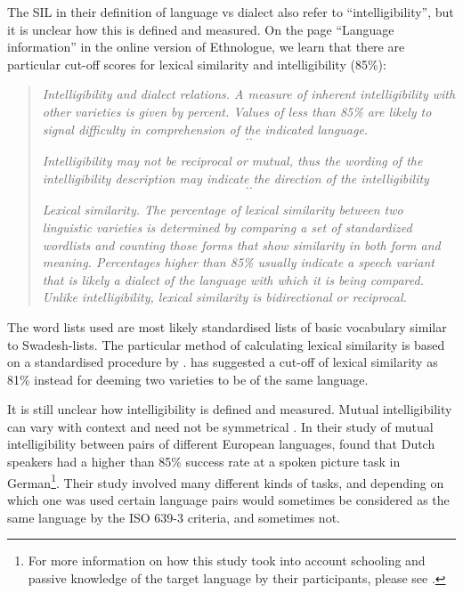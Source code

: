 \documentclass[a4paper,10pt]{article} %
\begin{document}
The SIL in their definition of language vs dialect also refer to ``intelligibility'', but it is unclear how this is defined and measured. On the page ``Language information'' in the online version of Ethnologue, we learn that there are particular cut-off scores for lexical similarity and intelligibility (85\%):


\begin{quotation}
\noindent\emph{Intelligibility and dialect relations. A measure of inherent intelligibility with other varieties is given by percent. Values of less than 85\% are likely to signal difficulty in comprehension of the indicated language.} \[..\]  

\noindent\emph{Intelligibility may not be reciprocal or mutual, thus the wording of the intelligibility description may indicate the direction of the intelligibility}\[..\]

\noindent\emph{Lexical similarity. The percentage of lexical similarity between two linguistic varieties is determined by comparing a set of standardized wordlists and counting those forms that show similarity in both form and meaning. Percentages higher than 85\% usually indicate a speech variant that is likely a dialect of the language with which it is being compared. Unlike intelligibility, lexical similarity is bidirectional or reciprocal.} 
\begin{flushright}\citet{ethnologue2019lgident}\end{flushright}
\end{quotation}

The word lists used are most likely standardised lists of basic vocabulary similar to Swadesh-lists. The particular method of calculating lexical similarity is based on a standardised procedure by \citet{rensch1992calculating}. \citet[326]{swadesh1954perspectives} has suggested a cut-off of lexical similarity as 81\% instead for deeming two varieties to be of the same language. 

It is still unclear how intelligibility is defined and measured. Mutual intelligibility can vary with context and need not be symmetrical \citep[356]{NETTLE1998}. In their study of mutual intelligibility between pairs of different European languages, \citet{gooskens2017measuring} found that Dutch speakers had a higher than 85\% success rate at a spoken picture task in German\footnote{For more information on how this study took into account schooling and passive knowledge of the target language by their participants, please see \citet{gooskens2017measuring}.}. Their study involved many different kinds of tasks, and depending on which one was used certain language pairs would sometimes be considered as the same language by the ISO 639-3 criteria, and sometimes not.
\end{document}
